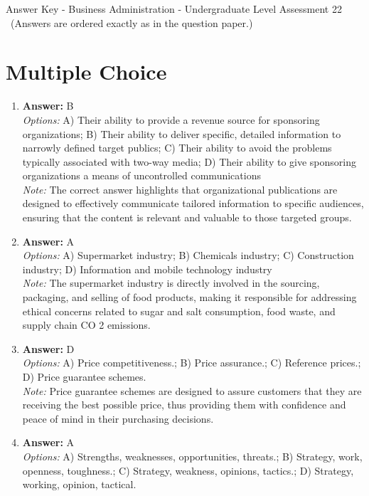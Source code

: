 \documentclass[12pt]{article}
\begin{document}
\begin{center}
Answer Key - Business Administration - Undergraduate Level Assessment 22 \
\small (Answers are ordered exactly as in the question paper.)
\end{center}

\section*{Multiple Choice}
\begin{enumerate}[label=\arabic*.]
\item \textbf{Answer:} B
\\ \textit{Options:} A) Their ability to provide a revenue source for sponsoring organizations; B) Their ability to deliver specific, detailed information to narrowly defined target publics; C) Their ability to avoid the problems typically associated with two-way media; D) Their ability to give sponsoring organizations a means of uncontrolled communications
\\ \textit{Note:} The correct answer highlights that organizational publications are designed to effectively communicate tailored information to specific audiences, ensuring that the content is relevant and valuable to those targeted groups.
\item \textbf{Answer:} A
\\ \textit{Options:} A) Supermarket industry; B) Chemicals industry; C) Construction industry; D) Information and mobile technology industry
\\ \textit{Note:} The supermarket industry is directly involved in the sourcing, packaging, and selling of food products, making it responsible for addressing ethical concerns related to sugar and salt consumption, food waste, and supply chain CO 2 emissions.
\item \textbf{Answer:} D
\\ \textit{Options:} A) Price competitiveness.; B) Price assurance.; C) Reference prices.; D) Price guarantee schemes.
\\ \textit{Note:} Price guarantee schemes are designed to assure customers that they are receiving the best possible price, thus providing them with confidence and peace of mind in their purchasing decisions.
\item \textbf{Answer:} A
\\ \textit{Options:} A) Strengths, weaknesses, opportunities, threats.; B) Strategy, work, openness, toughness.; C) Strategy, weakness, opinions, tactics.; D) Strategy, working, opinion, tactical.

\end{enumerate}
\end{document}

